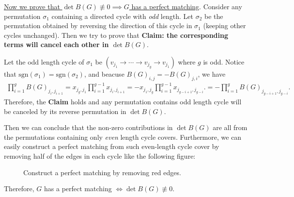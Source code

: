 \begin{answer}
\begin{enumerate}[label=\alph*).]
		\underline{Now we prove that $\det B(G) \not\equiv 0 \implies G$ has a perfect matching}.
		Consider any permutation $\sigma_1$ containing a directed cycle with \textit{odd} length. 
		Let $\sigma_2$ be the permutation obtained by reversing the direction of this cycle in $\sigma_1$ (keeping other cycles unchanged).
		Then we try to prove that \textbf{Claim: the corresponding terms will cancel each other in $\det B(G)$}.

		Let the odd length cycle of $\sigma_1$ be $(v_{j_1}\to \cdots \to v_{j_{g}} \to v_{j_1})$ where $g$ is odd. Notice that $\text{sgn}(\sigma_1) = \text{sgn}(\sigma_2)$, and beacuse $B(G)_{i,j} = -B(G)_{j,i}$, we have
		\begin{align*}
			\prod_{i=1}^{g} B(G)_{j_i, j_{i+1}} = x_{j_g, j_1}\prod_{i=1}^{g-1} x_{j_i, j_{i+1}} = -x_{j_1, j_g}\prod_{i=1}^{g-1} x_{j_{g-i+1}, j_{g-i}}.
			= -\prod_{i=1}^{g} B(G)_{j_{g-i+1}, j_{g-i}}.
		\end{align*}
		Therefore, the \textbf{Claim} holds and any permutation contains odd length cycle will be canceled by its reverse permutation in $\det B(G)$.
		
		Then we can conclude that the non-zero contributions in $\det B(G)$ are all from the permutations containing only \textit{even} length cycle covers.
		Furthermore, we can easily construct a perfect matching from such even-length cycle cover by removing half of the edges in each cycle like the following figure:

		\begin{figure}[htbp]
			\centering
			\caption{Construct a perfect matching by removing red edges.}
		\end{figure}

		Therefore, $G$ has a perfect matching $\iff \det B(G) \not\equiv 0$.
	\end{enumerate}
	\ed
\end{answer}